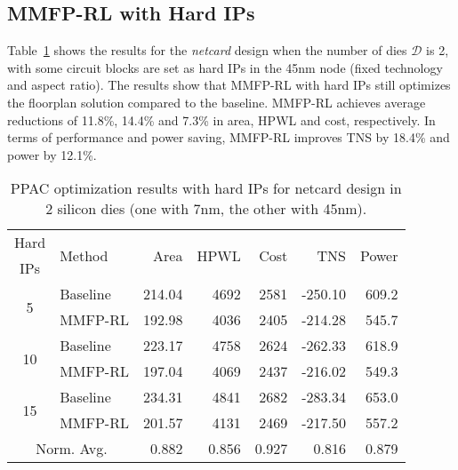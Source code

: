 \subsection{MMFP-RL with Hard IPs}

Table~\ref{tab:fixed_ips} shows the results for the \emph{netcard} design when the number of dies $\mathcal{D}$ is 2, with some circuit blocks are set as hard IPs in the 45nm node (fixed technology and aspect ratio). The results show that MMFP-RL with hard IPs still optimizes the floorplan solution compared to the baseline. MMFP-RL achieves average reductions of 11.8\%, 14.4\% and 7.3\% in area, HPWL and cost, respectively. In terms of performance and power saving, MMFP-RL improves TNS by 18.4\% and power by 12.1\%.


\vspace{-4mm}
\begin{table}[!ht]
\centering
\caption{PPAC optimization results with hard IPs for netcard design in 2 silicon dies (one with 7nm, the other with 45nm).}
\begin{tabular}{clrrrrr}
\hline
Hard & \multirow{2}{*}{Method} & \multirow{2}{*}{Area} & \multirow{2}{*}{HPWL} & \multirow{2}{*}{Cost} & \multirow{2}{*}{TNS} & \multirow{2}{*}{Power} \\
IPs & & & & & & \\
\hline
\hline
\multirow{2}{*}{5} & Baseline & 214.04 & 4692 & 2581 & -250.10 & 609.2 \\
& MMFP-RL & 192.98 & 4036 & 2405 & -214.28 & 545.7 \\
\hline
\multirow{2}{*}{10} & Baseline & 223.17 & 4758 & 2624 & -262.33 & 618.9 \\
& MMFP-RL & 197.04 & 4069 & 2437 & -216.02 & 549.3 \\
\hline
\multirow{2}{*}{15} & Baseline & 234.31 & 4841 & 2682 & -283.34 & 653.0 \\
& MMFP-RL & 201.57 & 4131 & 2469 & -217.50 & 557.2 \\
\hline
\hline
\multicolumn{2}{c}{Norm. Avg.} & 0.882 & 0.856 & 0.927 & 0.816 & 0.879 \\
\hline
\end{tabular}
\label{tab:fixed_ips}
\end{table}
